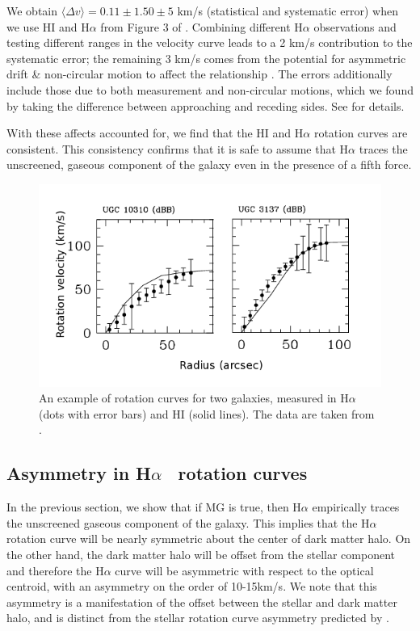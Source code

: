 \documentclass[twocolappendix, numberedappendix]{emulateapj}
\newcommand{\ha}{H$\alpha$}
\begin{document}
We obtain $\langle \Delta v\rangle=0.11\pm 1.50 \pm 5$ km/s (statistical and
systematic error) when we use HI and \ha{}
from Figure 3 of \citet{Swaters2009}.  Combining different \ha{} observations
and testing different ranges in the velocity curve leads to a 2 km/s
contribution to the systematic error; the remaining 3 km/s comes from the
potential for asymmetric drift \& non-circular motion to affect the
relationship \citep{Swaters2009, deblok2002}. The errors
additionally include those due to both measurement and non-circular motions,
which we found by taking the difference between approaching and receding
sides. See \citet{Swaters2009} for details. 

With these affects accounted for, we find that the HI and \ha{} rotation
curves are consistent.  This consistency confirms that it is safe to assume
that \ha{} traces the unscreened, gaseous component of the galaxy even
in the presence of a fifth force.

\begin{figure}
\begin{center}
  \includegraphics[scale=0.45]{figures/H1-HA-rot-eg.png}
\caption{An example of rotation curves for two galaxies, measured in \ha{}
(dots with error bars) and HI (solid lines).
The data are taken from \citet{Swaters2009}.}
\label{h1-ha-rot-eg}
\end{center}
\end{figure}


\subsection{Asymmetry in \ha~ rotation curves}\label{sec:asymmetry}

In the previous section, we show that if MG is true, then \ha{} empirically
traces the unscreened gaseous component of the galaxy. This implies
that the \ha{} rotation curve will be nearly symmetric about the
center of dark matter halo. On the other hand, the dark matter halo will be
offset from the stellar component and therefore the \ha{} curve will be
asymmetric with respect to the optical centroid, with an asymmetry on
the order of 10-15km/s. We note that this asymmetry is
a manifestation of the offset between the stellar and dark matter halo,
and is distinct from the stellar rotation curve asymmetry predicted by
\citet{bhuvjake2011}.
\end{document}
